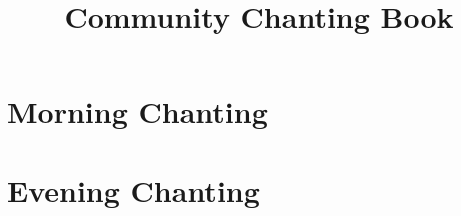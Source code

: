 \documentclass[final]{chantingbook}
\title{Community Chanting Book}
\begin{document}
\frontmatter



\mainmatter


\part{Morning Chanting}



\part{Evening Chanting}



%
%

%
%
\end{document}
